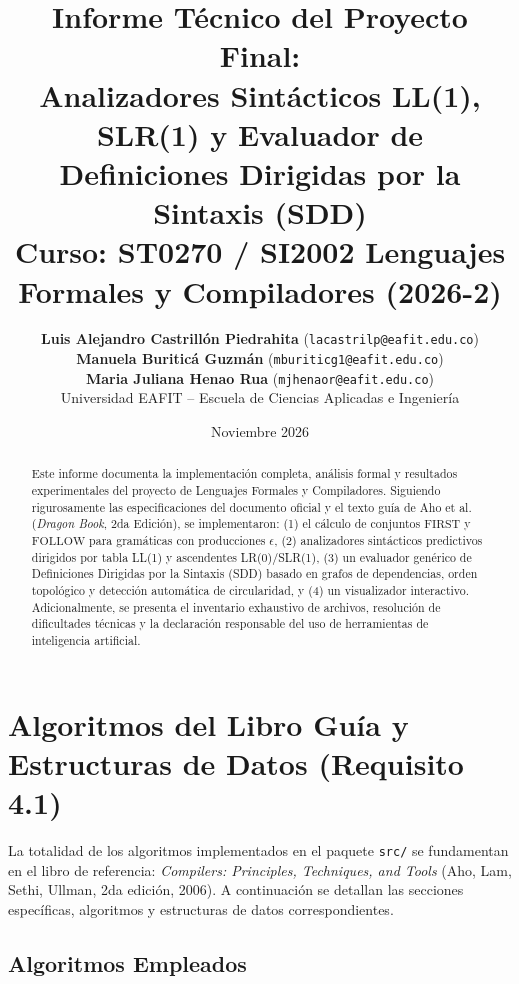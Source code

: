 \documentclass[11pt,a4paper]{article}
\title{\textbf{Informe Técnico del Proyecto Final:}\\
\Large Analizadores Sintácticos LL(1), SLR(1) y Evaluador de Definiciones Dirigidas por la Sintaxis (SDD)\\[0.4cm]
\large Curso: ST0270 / SI2002 Lenguajes Formales y Compiladores (2026-2)}
\author{
    \textbf{Luis Alejandro Castrillón Piedrahita} (\texttt{lacastrilp@eafit.edu.co})\\
    \textbf{Manuela Buriticá Guzmán} (\texttt{mburiticg1@eafit.edu.co})\\
    \textbf{Maria Juliana Henao Rua} (\texttt{mjhenaor@eafit.edu.co})\\[0.3cm]
    Universidad EAFIT -- Escuela de Ciencias Aplicadas e Ingeniería
}
\date{Noviembre 2026}
\begin{document}
\maketitle

\begin{abstract}
Este informe documenta la implementación completa, análisis formal y resultados experimentales del proyecto de Lenguajes Formales y Compiladores. Siguiendo rigurosamente las especificaciones del documento oficial y el texto guía de Aho et al. (\textit{Dragon Book}, 2da Edición), se implementaron: (1) el cálculo de conjuntos $\text{FIRST}$ y $\text{FOLLOW}$ para gramáticas con producciones $\epsilon$, (2) analizadores sintácticos predictivos dirigidos por tabla LL(1) y ascendentes LR(0)/SLR(1), (3) un evaluador genérico de Definiciones Dirigidas por la Sintaxis (SDD) basado en grafos de dependencias, orden topológico y detección automática de circularidad, y (4) un visualizador interactivo. Adicionalmente, se presenta el inventario exhaustivo de archivos, resolución de dificultades técnicas y la declaración responsable del uso de herramientas de inteligencia artificial.
\end{abstract}

\tableofcontents
\newpage

\section{Algoritmos del Libro Guía y Estructuras de Datos (Requisito 4.1)}

La totalidad de los algoritmos implementados en el paquete \texttt{src/} se fundamentan en el libro de referencia: \textit{Compilers: Principles, Techniques, and Tools} (Aho, Lam, Sethi, Ullman, 2da edición, 2006). A continuación se detallan las secciones específicas, algoritmos y estructuras de datos correspondientes.

\subsection{Algoritmos Empleados}
\end{document}
